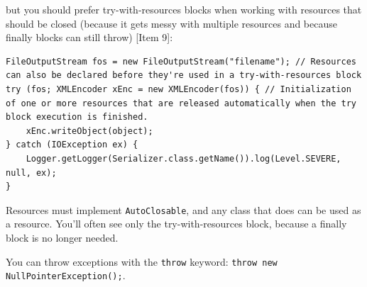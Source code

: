\documentclass[table, xcdraw]{article}%
\begin{document}
but you should prefer try-with-resources blocks when working with resources that should be closed (because it gets messy with multiple resources and because finally blocks can still throw) [Item 9]:

\begin{verbatim}
FileOutputStream fos = new FileOutputStream("filename"); // Resources can also be declared before they're used in a try-with-resources block
try (fos; XMLEncoder xEnc = new XMLEncoder(fos)) { // Initialization of one or more resources that are released automatically when the try block execution is finished.
    xEnc.writeObject(object);
} catch (IOException ex) {
    Logger.getLogger(Serializer.class.getName()).log(Level.SEVERE, null, ex);
}
\end{verbatim}

Resources must implement \texttt{AutoClosable}, and any class that does can be used as a resource. You'll often see only the try-with-resources block, because a finally block is no longer needed.

You can throw exceptions with the \texttt{throw} keyword: \texttt{throw new NullPointerException();}.
\end{document}
